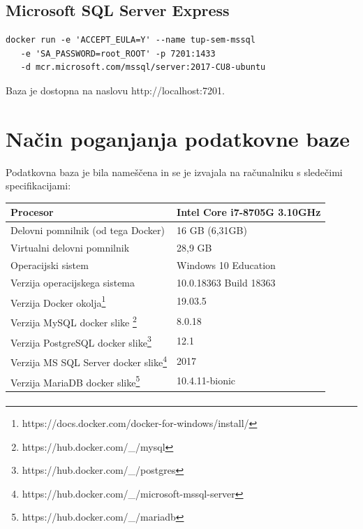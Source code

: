 \documentclass[a4paper,11pt]{report}
\begin{document}
\subsection{Microsoft SQL Server Express}
\begin{lstlisting}
docker run -e 'ACCEPT_EULA=Y' --name tup-sem-mssql 
   -e 'SA_PASSWORD=root_ROOT' -p 7201:1433 
   -d mcr.microsoft.com/mssql/server:2017-CU8-ubuntu
\end{lstlisting}
   
Baza je dostopna na naslovu http://localhost:7201.

\section{Način poganjanja podatkovne baze}
Podatkovna baza je bila nameščena in se je izvajala na računalniku s sledečimi specifikacijami:

\begin{center}
    \begin{tabular}{||l|l||}
        \hline
        Procesor & Intel Core i7-8705G 3.10GHz\\
        \hline
        Delovni pomnilnik (od tega Docker) & 16 GB (6,31GB)\\
        \hline
        Virtualni delovni pomnilnik & 28,9 GB\\
        \hline
        Operacijski sistem & Windows 10 Education\\
        \hline
        Verzija operacijskega sistema & 10.0.18363 Build 18363\\
        \hline
        Verzija Docker okolja\footnote{https://docs.docker.com/docker-for-windows/install/} & 19.03.5\\
        \hline
        Verzija MySQL docker slike \footnote{https://hub.docker.com/\_/mysql} & 8.0.18 \\
        \hline
        Verzija PostgreSQL docker slike\footnote{https://hub.docker.com/\_/postgres} & 12.1\\
        \hline
        Verzija MS SQL Server docker slike\footnote{https://hub.docker.com/\_/microsoft-mssql-server} & 2017\\
        \hline
        Verzija MariaDB docker slike\footnote{https://hub.docker.com/\_/mariadb} & 10.4.11-bionic\\
        \hline
    \end{tabular}
\end{center}
\paragraph{}
\pagebreak
\end{document}
